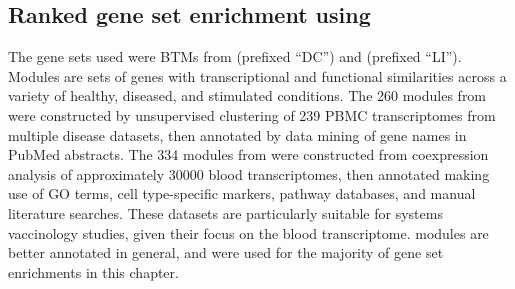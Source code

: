 \subsection{Ranked gene set enrichment using }
\label{subsec:hird_dge_geneSetEnrichment}


The gene sets used were \glspl{BTM} from \textcite{chaussabel2008ModularAnalysisFramework} (prefixed \enquote{DC}) and \textcite{li2013MolecularSignaturesAntibody} (prefixed \enquote{LI}).
Modules are sets of genes with transcriptional and functional similarities across a variety of healthy, diseased, and stimulated conditions.
The 260 modules from \textcite{chaussabel2008ModularAnalysisFramework} were constructed by unsupervised clustering of 239 \gls{PBMC} transcriptomes from multiple disease datasets,
then annotated by data mining of gene names in PubMed abstracts.
The 334 modules from \textcite{li2013MolecularSignaturesAntibody} were constructed from coexpression analysis of approximately \num{30000} blood transcriptomes,
then annotated making use of \gls{GO} terms, cell type-specific markers, pathway databases, and manual literature searches.
These datasets are particularly suitable for systems vaccinology studies, given their focus on the blood transcriptome.
\textcite{li2013MolecularSignaturesAntibody} modules are better annotated in general, and were used for the majority of gene set enrichments in this chapter.

